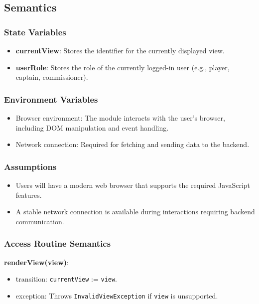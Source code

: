 \documentclass[12pt, titlepage]{article}
\begin{document}
\begin{itemize}
\subsection{Semantics}

\subsubsection{State Variables}

\begin{itemize}
    \item \textbf{currentView}: Stores the identifier for the currently displayed view.
    \item \textbf{userRole}: Stores the role of the currently logged-in user (e.g., player, captain, commissioner).
\end{itemize}

\subsubsection{Environment Variables}

\begin{itemize}
    \item Browser environment: The module interacts with the user's browser, including DOM manipulation and event handling.
    \item Network connection: Required for fetching and sending data to the backend.
\end{itemize}

\subsubsection{Assumptions}

\begin{itemize}
    \item Users will have a modern web browser that supports the required JavaScript features.
    \item A stable network connection is available during interactions requiring backend communication.
\end{itemize}

\subsubsection{Access Routine Semantics}

\noindent \textbf{renderView(view)}:
\begin{itemize}
    \item transition: \texttt{currentView} := \texttt{view}.
    \item exception: Throws \texttt{InvalidViewException} if \texttt{view} is unsupported.
\end{itemize}


\end{itemize}
\end{document}
